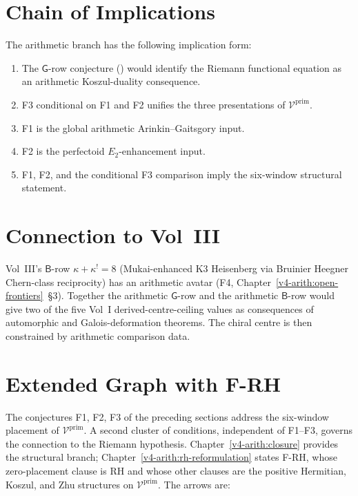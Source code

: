 \section{Chain of Implications}
\label{v4-arith:app:C:chain-of-implications}

The arithmetic branch has the following implication form:

\begin{enumerate}
\item The \(\mathsf{G}\)-row conjecture
() would identify the Riemann
functional equation as an arithmetic Koszul-duality consequence.
\item F3 conditional on F1 and F2 unifies the three presentations of
\(\mathcal V^{\mathrm{prim}}\).
\item F1 is the global arithmetic Arinkin--Gaitsgory input.
\item F2 is the perfectoid \(E_{2}\)-enhancement input.
\item F1, F2, and the conditional F3 comparison imply the six-window
structural statement.
\end{enumerate}

\section{Connection to Vol~III}
\label{v4-arith:app:C:vol3-connection}

Vol~III's \(\mathsf{B}\)-row \(\kappa+\kappa^{!}=8\) (Mukai-enhanced K3
Heisenberg via Bruinier Heegner Chern-class reciprocity) has an
arithmetic avatar (F4, Chapter~\ref{v4-arith:open-frontiers}~\S3).
Together the arithmetic \(\mathsf{G}\)-row and the arithmetic
\(\mathsf{B}\)-row would give two of the five Vol~I
derived-centre-ceiling values as consequences of automorphic and
Galois-deformation theorems.  The chiral centre is then constrained by
arithmetic comparison data.

\section{Extended Graph with F-RH}
\label{v4-arith:app:C:extended-graph}

The conjectures F1, F2, F3 of the preceding sections address the
six-window placement of \(\mathcal{V}^{\mathrm{prim}}\). A second
cluster of conditions, independent of F1--F3, governs the
connection to the Riemann hypothesis. Chapter~\ref{v4-arith:closure}
provides the structural branch; Chapter~\ref{v4-arith:rh-reformulation}
states F-RH, whose zero-placement clause is RH and whose other clauses
are the positive Hermitian, Koszul, and Zhu structures on
\(\mathcal{V}^{\mathrm{prim}}\). The arrows are:

